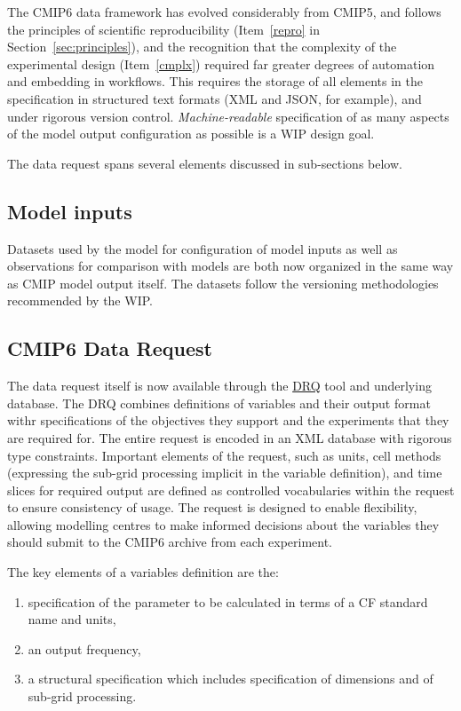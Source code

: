 \documentclass[gmd,manuscript]{copernicus}
\newcommand{\pipref}[1] {\citep{ref:#1}}
\newcommand{\secref}[1] {\mbox{Section  \ref{sec:#1}}}
\begin{document}
The CMIP6 data framework has evolved considerably from
CMIP5, and follows the principles of scientific reproducibility
(Item~\ref{repro} in \secref{principles}), and the recognition that
the complexity of the experimental design (Item~\ref{cmplx}) required
far greater degrees of automation and embedding in workflows. This
requires the storage of all elements in the specification in
structured text formats (XML and JSON, for example), and under
rigorous version control. \emph{Machine-readable} specification of as
many aspects of the model output configuration as possible is a WIP
design goal.

The data request spans several elements discussed in sub-sections below.

\subsection{Model inputs}
\label{sec:data-inputs}
Datasets used by the model for configuration of model inputs
  \citep[\texttt{input4MIPs}, see][]{ref:duracketal2017} as well as
  observations for comparison with models \citep[\texttt{obs4MIPs},
  see][]{ref:teixeiraetal2014} are both now organized in the same way
  as CMIP model output itself. The datasets follow the versioning
  methodologies recommended by the WIP.

\subsection{CMIP6 Data Request}
\label{sec:data-request}
The data request itself \pipref{juckesetal2015} is now available
  through the \href{https://goo.gl/iNBQ9m}{DRQ} tool and underlying
  database. The DRQ combines definitions of variables and their output format withr
 specifications of the objectives they support and the experiments that they are required for.
 The entire request is encoded in an XML database with rigorous type constraints. 
 Important elements of the request, such as units, cell methods (expressing the sub-grid processing implicit in the variable definition),
 and time slices for required output are defined as controlled vocabularies within the request to ensure consistency of usage.
 The request is designed to enable flexibility, allowing modelling centres to make informed decisions about the variables they should 
submit to the CMIP6 archive from each experiment. 


The key elements of a variables definition are the:
\begin{enumerate}
 \item specification of the parameter to be calculated in terms of a CF standard name and units, 
  \item an output frequency,
  \item a structural specification which includes specification of dimensions and of sub-grid processing.
\end{enumerate}
\end{document}
